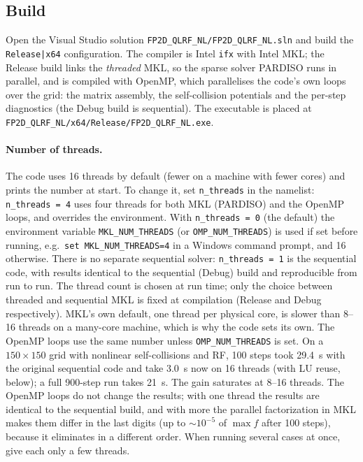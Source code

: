 \documentclass[11pt,a4paper]{article}
\begin{document}
\subsection{Build}

Open the Visual Studio solution
\texttt{FP2D\_QLRF\_NL/FP2D\_QLRF\_NL.sln} and build the
\texttt{Release|x64} configuration.  The compiler is Intel \texttt{ifx}
with Intel MKL; the Release build links the \emph{threaded} MKL, so the
sparse solver PARDISO runs in parallel, and is compiled with OpenMP, which
parallelises the code's own loops over the grid: the matrix assembly, the
self-collision potentials and the per-step diagnostics (the Debug build is
sequential).  The executable is placed at
\texttt{FP2D\_QLRF\_NL/x64/Release/FP2D\_QLRF\_NL.exe}.

\paragraph{Number of threads.}\label{sec:threads}  The code uses 16 threads by default (fewer on a
machine with fewer cores) and prints the number at start.  To change it, set
\texttt{n\_threads} in the namelist: \texttt{n\_threads = 4} uses four threads
for both MKL (PARDISO) and the OpenMP loops, and overrides the environment.
With \texttt{n\_threads = 0} (the default) the environment variable
\texttt{MKL\_NUM\_THREADS} (or \texttt{OMP\_NUM\_THREADS}) is used if set before
running, e.g.\ \texttt{set MKL\_NUM\_THREADS=4} in a Windows command prompt, and
16 otherwise.  There is no separate sequential solver: \texttt{n\_threads = 1}
is the sequential code, with results identical to the sequential (Debug) build
and reproducible from run to run.  The thread count is chosen at run time; only
the choice between threaded and sequential MKL is fixed at compilation (Release
and Debug respectively).  MKL's own default, one thread per physical core, is slower than 8--16
threads on a many-core machine, which is why the code sets its own.  The OpenMP
loops use the same number unless \texttt{OMP\_NUM\_THREADS} is set.  On a
$150\times150$ grid with nonlinear self-collisions and RF, 100 steps took 29.4~s
with the original sequential code and take 3.0~s now on 16 threads (with LU
reuse, below); a full 900-step run takes 21~s.  The gain saturates at 8--16
threads.  The OpenMP loops do not change the results; with one thread the
results are identical to the sequential build, and with more the parallel
factorization in MKL makes them differ in the last digits (up to
${\sim}10^{-5}$ of $\max f$ after 100 steps), because it eliminates in a
different order.  When running several cases at once, give each only a few
threads.
\end{document}
